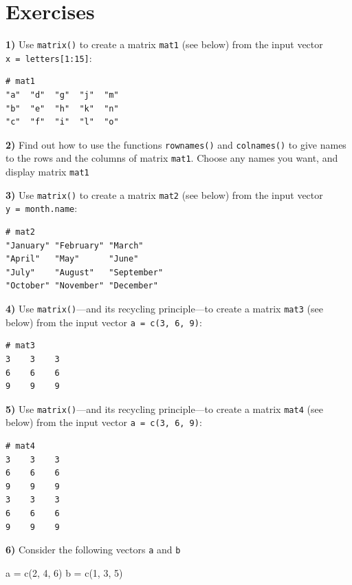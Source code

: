 \documentclass[
]{book}
\newenvironment{Shaded}{\begin{snugshade}}{\end{snugshade}}
\newcommand{\DecValTok}[1]{\textcolor[rgb]{0.00,0.00,0.81}{#1}}
\newcommand{\FunctionTok}[1]{\textcolor[rgb]{0.00,0.00,0.00}{#1}}
\newcommand{\NormalTok}[1]{#1}
\newcommand{\OtherTok}[1]{\textcolor[rgb]{0.56,0.35,0.01}{#1}}
\begin{document}
\hypertarget{exercises-4}{%
\section{Exercises}\label{exercises-4}}

\textbf{1)} Use \texttt{matrix()} to create a matrix \texttt{mat1} (see below) from the input
vector \texttt{x\ =\ letters{[}1:15{]}}:

\begin{verbatim}
# mat1
"a"  "d"  "g"  "j"  "m" 
"b"  "e"  "h"  "k"  "n" 
"c"  "f"  "i"  "l"  "o"
\end{verbatim}

\textbf{2)} Find out how to use the functions \texttt{rownames()} and \texttt{colnames()} to give
names to the rows and the columns of matrix \texttt{mat1}. Choose any names you want,
and display matrix \texttt{mat1}

\textbf{3)} Use \texttt{matrix()} to create a matrix \texttt{mat2} (see below) from the input
vector \texttt{y\ =\ month.name}:

\begin{verbatim}
# mat2
"January" "February" "March"    
"April"   "May"      "June"     
"July"    "August"   "September"
"October" "November" "December" 
\end{verbatim}

\textbf{4)} Use \texttt{matrix()}---and its recycling principle---to create a matrix \texttt{mat3}
(see below) from the input vector \texttt{a\ =\ c(3,\ 6,\ 9)}:

\begin{verbatim}
# mat3
3    3    3
6    6    6
9    9    9
\end{verbatim}

\textbf{5)} Use \texttt{matrix()}---and its recycling principle---to create a matrix \texttt{mat4}
(see below) from the input vector \texttt{a\ =\ c(3,\ 6,\ 9)}:

\begin{verbatim}
# mat4
3    3    3
6    6    6
9    9    9
3    3    3
6    6    6
9    9    9
\end{verbatim}

\textbf{6)} Consider the following vectors \texttt{a} and \texttt{b}

\begin{Shaded}
\begin{Highlighting}[]
\NormalTok{a }\OtherTok{=} \FunctionTok{c}\NormalTok{(}\DecValTok{2}\NormalTok{, }\DecValTok{4}\NormalTok{, }\DecValTok{6}\NormalTok{)}
\NormalTok{b }\OtherTok{=} \FunctionTok{c}\NormalTok{(}\DecValTok{1}\NormalTok{, }\DecValTok{3}\NormalTok{, }\DecValTok{5}\NormalTok{)}
\end{Highlighting}
\end{Shaded}
\end{document}
